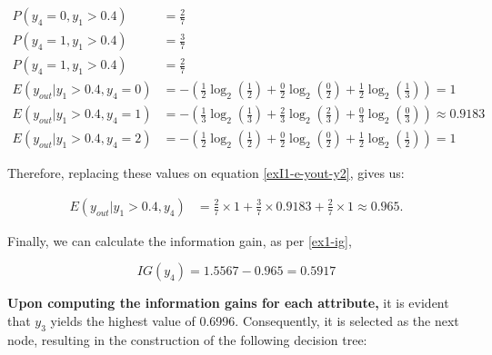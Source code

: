 \documentclass[12pt]{article}
\begin{document}
\begin{enumerate}[leftmargin=\labelsep]
    \[
        \begin{aligned}
            P(y_4 = 0, y_1 > 0.4)          & = \frac{2}{7}                                                                                       \\
            P(y_4 = 1, y_1 > 0.4)          & = \frac{3}{7}                                                                                       \\
            P(y_4 = 1, y_1 > 0.4)          & = \frac{2}{7}                                                                                       \\
            E(y_{out} | y_1 > 0.4 , y_4 = 0) & = - \left(\frac{1}{2} \log_2\left(\frac{1}{2}\right) + \frac{0}{2} \log_2\left(\frac{0}{2}\right)
                + \frac{1}{2} \log_2\left(\frac{1}{3}\right)\right) = 1                                                                          \\
            E(y_{out} | y_1 > 0.4 , y_4 = 1) & = - \left(\frac{1}{3} \log_2\left(\frac{1}{3}\right) + \frac{2}{3} \log_2\left(\frac{2}{3}\right)
                + \frac{0}{3} \log_2\left(\frac{0}{3}\right)\right) \approx 0.9183                                                               \\
            E(y_{out} | y_1 > 0.4 , y_4 = 2) & = - \left(\frac{1}{2} \log_2\left(\frac{1}{2}\right) + \frac{0}{2} \log_2\left(\frac{0}{2}\right)
                + \frac{1}{2} \log_2\left(\frac{1}{2}\right)\right) = 1
        \end{aligned}
    \]

    Therefore, replacing these values on equation \eqref{exI1-e-yout-y2}, gives us:

    \[
        \begin{aligned}
            E(y_{out} | y_1>0.4, y_4) & = \frac{2}{7} \times 1 + \frac{3}{7} \times 0.9183 +  \frac{2}{7} \times 1 \approx 0.965.
        \end{aligned}
    \]

    Finally, we can calculate the information gain, as per \eqref{ex1-ig},

    \[
        IG(y_{4}) = 1.5567 - 0.965 = 0.5917
    \]

    \textbf{Upon computing the information gains for each attribute,} it is evident that $y_3$ yields the highest value of 0.6996. Consequently,
        it is selected as the next node, resulting in the construction of the following decision tree:


\end{enumerate}
\end{document}
